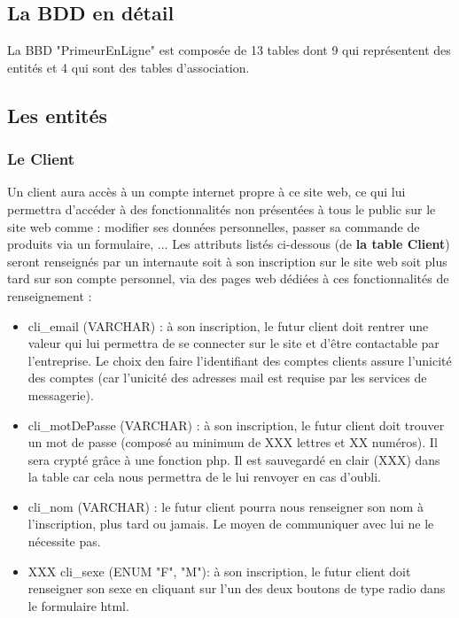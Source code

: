 \documentclass[a4paper, 12pt]{report}
\begin{document}
\begin{spacing}{1.2}
\newpage
\textcolor{colortitre1}{\section*{La BDD en détail}} 

La BBD "PrimeurEnLigne" est composée de 13 tables dont 9 qui représentent des entités et 4 qui sont des tables d'association.

\textcolor{colortitre2}{\subsection*{Les entités}}

\textcolor{colortitre3}{\subsubsection*{Le Client}}
Un client aura accès à un compte internet propre à ce site web, ce qui lui permettra d'accéder à des fonctionnalités non présentées à tous le public sur le site web comme : modifier ses données personnelles, passer sa commande de produits via un formulaire, ...
Les attributs listés ci-dessous (de \textbf{la table Client}) seront renseignés par un internaute soit à son inscription sur le site web soit plus tard sur son compte personnel, via des pages web dédiées à ces fonctionnalités de renseignement :
\begin{itemize}
	\item cli_email (VARCHAR) : à son inscription, le futur client doit rentrer une valeur qui lui permettra de se connecter sur le site et d'être contactable par l'entreprise. Le choix den faire l'identifiant des comptes clients assure l'unicité des comptes (car l'unicité des adresses mail est requise par les services de messagerie).
	\item cli_motDePasse (VARCHAR) : à son inscription, le futur client doit trouver un mot de passe (composé au minimum de XXX lettres et XX numéros). Il sera crypté grâce à une fonction php. Il est sauvegardé en clair (XXX) dans la table car cela nous permettra de le lui renvoyer en cas d'oubli.
	\item cli_nom (VARCHAR) : le futur client pourra nous renseigner son nom à l'inscription, plus tard ou jamais. Le moyen de communiquer avec lui ne le nécessite pas.
	\item XXX cli_sexe (ENUM {"F", "M"}): à son inscription, le futur client doit renseigner son sexe en cliquant sur l'un des deux boutons de type radio dans le formulaire html.

\end{itemize}
\end{spacing}
\end{document}
